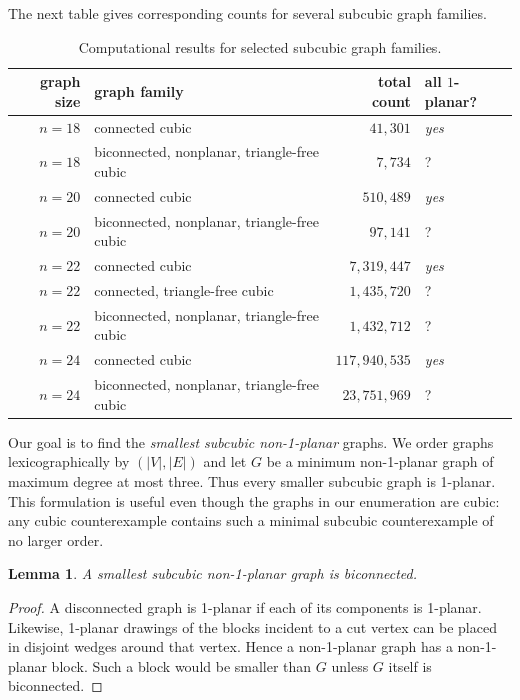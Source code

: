 \documentclass[a4paper,11pt]{article}
\theoremstyle{plain}
\newtheorem{lemma}{Lemma}
\theoremstyle{definition}  %
\newcommand{\df}[1]{\textcolor{defblue}{\emph{#1}}}
\newcommand{\yes}{{\it \textcolor{defgreen}{yes}}}
\begin{document}
The next table gives corresponding counts for several subcubic graph
families.

\begin{table}[!h]
    \small
    \centering
    \caption{Computational results for selected subcubic graph families.}
    \label{table:subcubic}
    \begin{tabular}{@{}r p{205pt} r C{55pt}@{}}
        \toprule
        graph size & graph family & total count & all $1$-planar? \\
        \midrule
        $n=18$ & connected cubic                         & $41,\!301$ & \yes \\
        $n=18$ & biconnected, nonplanar, triangle-free cubic & $7,\!734$ & ? \\
        $n=20$ & connected cubic                         & $510,\!489$ & \yes \\
        $n=20$ & biconnected, nonplanar, triangle-free cubic & $97,\!141$ & ? \\
        $n=22$ & connected cubic                         & $7,\!319,\!447$ & \yes \\
        $n=22$ & connected, triangle-free cubic          & $1,\!435,\!720$ & ? \\
        $n=22$ & biconnected, nonplanar, triangle-free cubic & $1,\!432,\!712$ & ? \\
        $n=24$ & connected cubic                         & $117,\!940,\!535$ & \yes \\
        $n=24$ & biconnected, nonplanar, triangle-free cubic & $23,\!751,\!969$ & ? \\
        \bottomrule
    \end{tabular}
\end{table}

Our goal is to find the \df{smallest subcubic non-1-planar} graphs.  We order
graphs lexicographically by $(|V|,|E|)$ and let $G$ be a minimum non-1-planar
graph of maximum degree at most three.  Thus every smaller subcubic graph is
1-planar.  This formulation is useful even though the graphs in our
enumeration are cubic: any cubic counterexample contains such a minimal
subcubic counterexample of no larger order.

\begin{lemma}
    A smallest subcubic non-1-planar graph is biconnected.
\end{lemma}

\begin{proof}
    A disconnected graph is 1-planar if each of its components is 1-planar.
    Likewise, 1-planar drawings of the blocks incident to a cut vertex can be
    placed in disjoint wedges around that vertex.  Hence a non-1-planar graph
    has a non-1-planar block.  Such a block would be smaller than $G$ unless
    $G$ itself is biconnected.
\end{proof}
\end{document}
